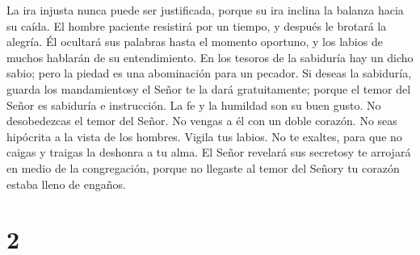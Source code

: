  La ira injusta nunca puede ser justificada, porque su
ira inclina la balanza hacia su caída.  El hombre
paciente resistirá por un tiempo, y después le brotará la alegría.
 Él ocultará sus palabras hasta el momento oportuno, y
los labios de muchos hablarán de su entendimiento.  En
los tesoros de la sabiduría hay un dicho sabio; pero la piedad es una
abominación para un pecador.  Si deseas la sabiduría,
guarda los mandamientosy el Señor te la dará gratuitamente;
 porque el temor del Señor es sabiduría e instrucción. La
fe y la humildad son su buen gusto.  No desobedezcas el
temor del Señor. No vengas a él con un doble corazón.  No
seas hipócrita a la vista de los hombres. Vigila tus labios.
 No te exaltes, para que no caigas y traigas la deshonra
a tu alma. El Señor revelará sus secretosy te arrojará en medio de la
congregación, porque no llegaste al temor del Señory tu corazón estaba
lleno de engaños.

\hypertarget{section-1}{%
\section{2}\label{section-1}}

